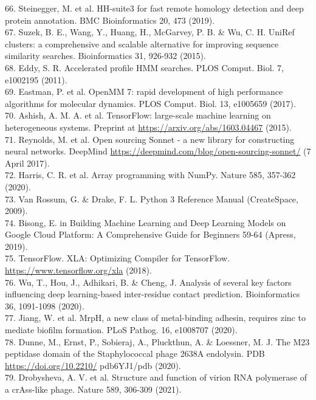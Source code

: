 \documentclass[10pt]{article}
\begin{document}
66. Steinegger, M. et al. HH-suite3 for fast remote homology detection and deep protein annotation. BMC Bioinformatics 20, 473 (2019).\\
67. Suzek, B. E., Wang, Y., Huang, H., McGarvey, P. B. \& Wu, C. H. UniRef clusters: a comprehensive and scalable alternative for improving sequence similarity searches. Bioinformatics 31, 926-932 (2015).\\
68. Eddy, S. R. Accelerated profile HMM searches. PLOS Comput. Biol. 7, e1002195 (2011).\\
69. Eastman, P. et al. OpenMM 7: rapid development of high performance algorithms for molecular dynamics. PLOS Comput. Biol. 13, e1005659 (2017).\\
70. Ashish, A. M. A. et al. TensorFlow: large-scale machine learning on heterogeneous systems. Preprint at \href{https://arxiv.org/abs/1603.04467}{https://arxiv.org/abs/1603.04467} (2015).\\
71. Reynolds, M. et al. Open sourcing Sonnet - a new library for constructing neural networks. DeepMind \href{https://deepmind.com/blog/open-sourcing-sonnet/}{https://deepmind.com/blog/open-sourcing-sonnet/} (7 April 2017).\\
72. Harris, C. R. et al. Array programming with NumPy. Nature 585, 357-362 (2020).\\
73. Van Rossum, G. \& Drake, F. L. Python 3 Reference Manual (CreateSpace, 2009).\\
74. Bisong, E. in Building Machine Learning and Deep Learning Models on Google Cloud Platform: A Comprehensive Guide for Beginners 59-64 (Apress, 2019).\\
75. TensorFlow. XLA: Optimizing Compiler for TensorFlow. \href{https://www.tensorflow.org/xla}{https://www.tensorflow.org/xla} (2018).\\
76. Wu, T., Hou, J., Adhikari, B. \& Cheng, J. Analysis of several key factors influencing deep learning-based inter-residue contact prediction. Bioinformatics 36, 1091-1098 (2020).\\
77. Jiang, W. et al. MrpH, a new class of metal-binding adhesin, requires zinc to mediate biofilm formation. PLoS Pathog. 16, e1008707 (2020).\\
78. Dunne, M., Ernst, P., Sobieraj, A., Pluckthun, A. \& Loessner, M. J. The M23 peptidase domain of the Staphylococcal phage 2638A endolysin. PDB \href{https://doi.org/10.2210/}{https://doi.org/10.2210/} pdb6YJ1/pdb (2020).\\
79. Drobysheva, A. V. et al. Structure and function of virion RNA polymerase of a crAss-like phage. Nature 589, 306-309 (2021).\\
\end{document}
